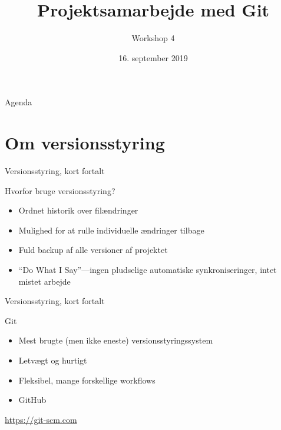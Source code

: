 \documentclass[10pt]{beamer}
\title{Projektsamarbejde med Git}
\subtitle{Workshop 4}
\date{16. september 2019}
\begin{document}
{\aauwavesbg
  \begin{frame}
    \titlepage
  \end{frame}}

\begin{frame}{Agenda}
  \tableofcontents
\end{frame}

\section{Om versionsstyring}
\label{sec:about}

\begin{frame}{Versionsstyring, kort fortalt}
  \begin{block}{Hvorfor bruge versionsstyring?}
    \begin{itemize}
    \item Ordnet historik over filændringer
    \item Mulighed for at rulle individuelle ændringer tilbage
    \item Fuld backup af alle versioner af projektet
    \item ``Do What I Say''---ingen pludselige automatiske synkroniseringer, intet mistet arbejde
    \end{itemize}
  \end{block}
\end{frame}

\begin{frame}{Versionsstyring, kort fortalt}
  \begin{block}{Git}
    \begin{itemize}
    \item Mest brugte (men ikke eneste) versionsstyringssystem
    \item Letvægt og hurtigt
    \item Fleksibel, mange forskellige workflows
    \item GitHub
    \end{itemize}
  \end{block}

  \begin{block}{\href{https://git-scm.com}{https://git-scm.com}}
  \end{block}
\end{frame}
\end{document}

